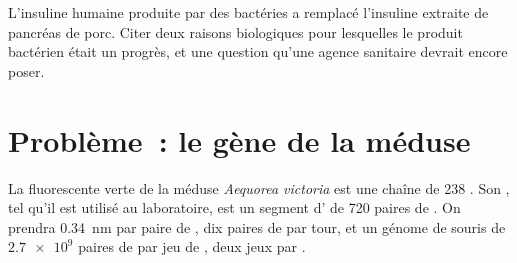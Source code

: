 \begin{exercise}[$\star\star\star$]\label{exo:g10:universal-dna:15}
L'insuline humaine produite par des bactéries a remplacé l'insuline
extraite de pancréas de porc. Citer deux raisons biologiques pour
lesquelles le produit bactérien était un progrès, et une question
qu'une agence sanitaire devrait encore poser.
\end{exercise}

\section{Problème~: le gène de la méduse}

\begin{problem}
\label{pb:g10:universal-dna:1}
La  fluorescente verte de la méduse \emph{Aequorea victoria}
est une chaîne de 238 . Son , tel qu'il est utilisé au
laboratoire, est un segment d' de 720 paires de . On prendra
\qty{0.34}{nm} par paire de , dix paires de  par tour, et un
génome de souris de $\num{2.7e9}$ paires de  par jeu de
, deux jeux par .


\end{problem}
